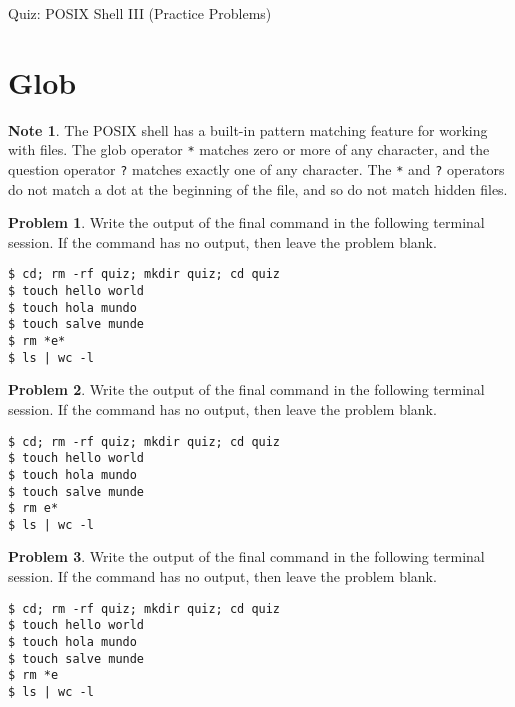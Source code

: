 \documentclass[10pt]{article}
\theoremstyle{definition}
\newtheorem{problem}{Problem}
\newtheorem{note}{Note}
\begin{document}
\begin{center}
    {
\Large
    Quiz: POSIX Shell III (Practice Problems)
}

    \vspace{0.1in}
\end{center}

\section{Glob}

\begin{note}
    The POSIX shell has a built-in pattern matching feature for working with files.
    The glob operator \lstinline{*} matches zero or more of any character,
    and the question operator \lstinline{?} matches exactly one of any character.
    The \lstinline{*} and \lstinline{?} operators do not match a dot at the beginning of the file, and so do not match hidden files.
\end{note}

\filbreak
\begin{problem}
    Write the output of the final command in the following terminal session.
    If the command has no output, then leave the problem blank.
\end{problem}
\begin{lstlisting}
$ cd; rm -rf quiz; mkdir quiz; cd quiz
$ touch hello world
$ touch hola mundo 
$ touch salve munde
$ rm *e*
$ ls | wc -l
\end{lstlisting}

\filbreak
\begin{problem}
    Write the output of the final command in the following terminal session.
    If the command has no output, then leave the problem blank.
\end{problem}
\begin{lstlisting}
$ cd; rm -rf quiz; mkdir quiz; cd quiz
$ touch hello world
$ touch hola mundo 
$ touch salve munde
$ rm e*
$ ls | wc -l
\end{lstlisting}

\filbreak
\begin{problem}
    Write the output of the final command in the following terminal session.
    If the command has no output, then leave the problem blank.
\end{problem}
\begin{lstlisting}
$ cd; rm -rf quiz; mkdir quiz; cd quiz
$ touch hello world
$ touch hola mundo 
$ touch salve munde
$ rm *e
$ ls | wc -l
\end{lstlisting}
\end{document}
